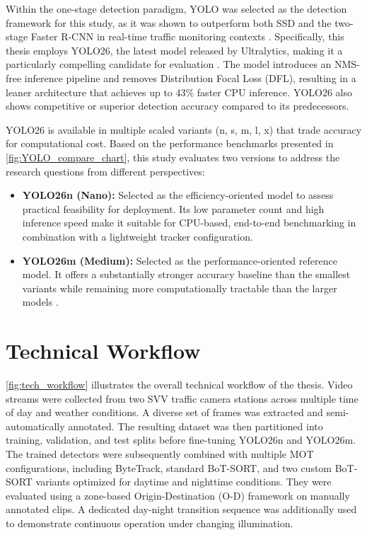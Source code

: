 Within the one-stage detection paradigm, YOLO was selected as the detection framework for this study, as it was shown to outperform both SSD and the two-stage Faster R-CNN in real-time traffic monitoring contexts \citep{smartcities6050134}. Specifically, this thesis employs YOLO26, the latest model released by Ultralytics, making it a particularly compelling candidate for evaluation \citep{sapkota2026yolo26keyarchitecturalenhancements}. The model introduces an NMS-free inference pipeline and removes Distribution Focal Loss (DFL), resulting in a leaner architecture that achieves up to 43\% faster CPU inference. YOLO26 also shows competitive or superior detection accuracy compared to its predecessors.

YOLO26 is available in multiple scaled variants (n, s, m, l, x) that trade accuracy for computational cost. Based on the performance benchmarks presented in \autoref{fig:YOLO_compare_chart}, this study evaluates two versions to address the research questions from different perspectives:

\begin{itemize}
   \item \textbf{YOLO26n (Nano):} Selected as the efficiency-oriented model to assess practical feasibility for deployment. Its low parameter count and high inference speed make it suitable for CPU-based, end-to-end benchmarking in combination with a lightweight tracker configuration.

   \item \textbf{YOLO26m (Medium):} Selected as the performance-oriented reference model. It offers a substantially stronger accuracy baseline than the smallest variants while remaining more computationally tractable than the larger models \citep{sapkota2026yolo26keyarchitecturalenhancements}.
\end{itemize}
 
\section{Technical Workflow}
\autoref{fig:tech_workflow} illustrates the overall technical workflow of the thesis. Video streams were collected from two SVV traffic camera stations across multiple time of day and weather conditions. A diverse set of frames was extracted and semi-automatically annotated. The resulting dataset was then partitioned into training, validation, and test splits before fine-tuning YOLO26n and YOLO26m. The trained detectors were subsequently combined with multiple MOT configurations, including ByteTrack, standard BoT-SORT, and two custom BoT-SORT variants optimized for daytime and nighttime conditions. They were evaluated using a zone-based Origin-Destination (O-D) framework on manually annotated clips. A dedicated day-night transition sequence was additionally used to demonstrate continuous operation under changing illumination.

